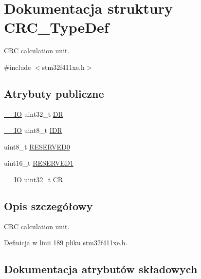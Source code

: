 \hypertarget{struct_c_r_c___type_def}{}\section{Dokumentacja struktury C\+R\+C\+\_\+\+Type\+Def}
\label{struct_c_r_c___type_def}


C\+RC calculation unit.  




{\ttfamily \#include $<$stm32f411xe.\+h$>$}

\subsection*{Atrybuty publiczne}
\begin{DoxyCompactItemize}
\item 
\hyperlink{core__sc300_8h_aec43007d9998a0a0e01faede4133d6be}{\+\_\+\+\_\+\+IO} uint32\+\_\+t \hyperlink{struct_c_r_c___type_def_a50cb22870dbb9001241cec694994e5ef}{DR}
\item 
\hyperlink{core__sc300_8h_aec43007d9998a0a0e01faede4133d6be}{\+\_\+\+\_\+\+IO} uint8\+\_\+t \hyperlink{struct_c_r_c___type_def_ad84e8694cd4b5375ee533c2d875c3b5a}{I\+DR}
\item 
uint8\+\_\+t \hyperlink{struct_c_r_c___type_def_a70dfd1730dba65041550ef55a44db87c}{R\+E\+S\+E\+R\+V\+E\+D0}
\item 
uint16\+\_\+t \hyperlink{struct_c_r_c___type_def_a8b205c6e25b1808ac016db2356b3021d}{R\+E\+S\+E\+R\+V\+E\+D1}
\item 
\hyperlink{core__sc300_8h_aec43007d9998a0a0e01faede4133d6be}{\+\_\+\+\_\+\+IO} uint32\+\_\+t \hyperlink{struct_c_r_c___type_def_af33fa5c173e1c102e6d0242fe60e569f}{CR}
\end{DoxyCompactItemize}


\subsection{Opis szczegółowy}
C\+RC calculation unit. 

Definicja w linii 189 pliku stm32f411xe.\+h.



\subsection{Dokumentacja atrybutów składowych}
\mbox{\label{struct_c_r_c___type_def_af33fa5c173e1c102e6d0242fe60e569f}} 
